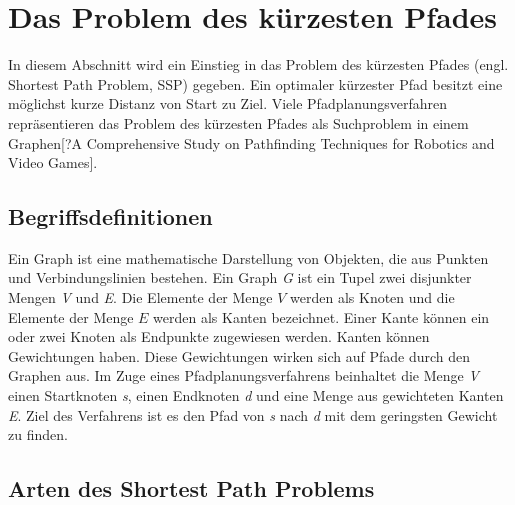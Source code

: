 \chapter{Das Problem des kürzesten Pfades}

In diesem Abschnitt wird ein Einstieg in das Problem des kürzesten Pfades (engl. Shortest Path Problem, SSP) gegeben. Ein optimaler kürzester Pfad besitzt eine möglichst kurze Distanz von Start zu Ziel\cite{Madkour.2017}. Viele Pfadplanungsverfahren repräsentieren das Problem des kürzesten Pfades als Suchproblem in einem Graphen[?A Comprehensive Study on Pathfinding Techniques for Robotics and Video Games]. %

\section{Begriffsdefinitionen}

Ein Graph ist eine mathematische Darstellung von Objekten, die aus Punkten und Verbindungslinien bestehen. Ein Graph \textit{G} ist ein Tupel zwei disjunkter Mengen \textit{V} und \textit{E}. Die Elemente der Menge $V$ werden als Knoten und die Elemente der Menge $E$ werden als Kanten bezeichnet. Einer Kante können ein oder zwei Knoten als Endpunkte zugewiesen werden. Kanten können Gewichtungen haben. Diese Gewichtungen wirken sich auf Pfade durch den Graphen aus\cite{Gross.2004}. Im Zuge eines Pfadplanungsverfahrens beinhaltet die Menge \textit{V} einen Startknoten \textit{s}, einen Endknoten \textit{d} und eine Menge aus gewichteten Kanten \textit{E}. %
Ziel des Verfahrens ist es den Pfad von \textit{s} nach \textit{d} mit dem geringsten Gewicht zu finden\cite{Madkour.2017}. 



\section{Arten des Shortest Path Problems}

